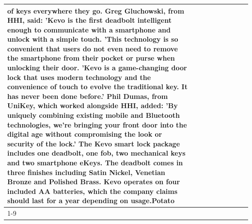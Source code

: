 \begin{table}[H]
\begin{tabular}{lllrlllll}
of keys everywhere they go. Greg Gluchowski, from HHI, said: 'Kevo is the first deadbolt intelligent enough to communicate with a smartphone and unlock with a simple touch. 'This technology is so convenient that users do not even need to remove the smartphone from their pocket or purse when unlocking their door. 'Kevo is a game-changing door lock that uses modern technology and the convenience of touch to evolve the traditional key. It has never been done before.' Phil Dumas, from UniKey, which worked alongside HHI, added: 'By uniquely combining existing mobile and Bluetooth technologies, we’re bringing your front door into the digital age without compromising the look or security of the lock.' The Kevo smart lock package includes one deadbolt, one fob, two mechanical keys and two smartphone eKeys. The deadbolt comes in three finishes including Satin Nickel, Venetian Bronze and Polished Brass. Kevo operates on four included AA batteries, which the company claims should last for a year depending on usage.Potato \\
\cline{1-9}

\end{tabular}
\end{table}
